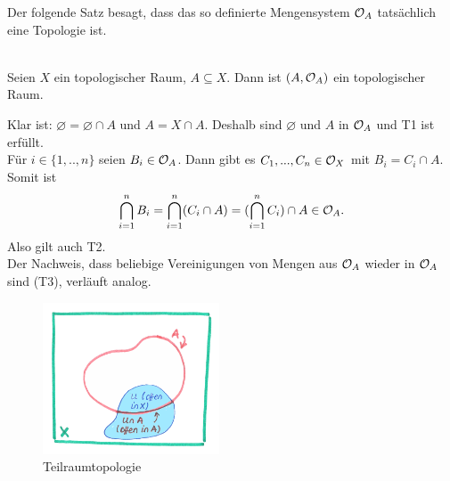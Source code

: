     Der folgende Satz besagt, dass das so definierte Mengensystem $\mathcal{O}_A$ tatsächlich eine Topologie ist.
    \begin{satz} \label{satz:trTop}\ \\
        Seien $X$ ein topologischer Raum, $A \subseteq X$. Dann ist $(A,\mathcal{O}_A)$ ein topologischer Raum.	
    \end{satz}
    \begin{bew}
        Klar ist: $\varnothing = \varnothing \cap A$ und $A = X \cap A$. 
        Deshalb sind $\varnothing$ und $A$ in $\mathcal{O}_A$ und T1 ist erfüllt.
        \\
        Für $i \in \{1, .., n\}$ seien $B_i \in \mathcal{O}_A$. 
        Dann gibt es $C_1, ..., C_n \in \mathcal{O}_X$ mit $B_i = C_i \cap A$. 
        Somit ist 
        \begin{align*}
            \bigcap_{i=1}^n B_i = \bigcap_{i=1}^n (C_i \cap A) = (\bigcap_{i=1}^n C_i) \cap A \in \mathcal{O}_A.
        \end{align*}
        Also gilt auch T2.\\
        Der Nachweis, dass beliebige Vereinigungen von Mengen aus $\mathcal{O}_A$ wieder in $\mathcal{O}_A$ sind (T3), verläuft analog.
    \end{bew}

    
    
    \begin{figure}[ht]
        \centering
        \includegraphics[height=4.5cm]{bearbeitet-22-04-25/teilraumtop.png}
        \caption{Teilraumtopologie}
        \label{fig:teilraumtop}
    \end{figure}
    
    
    
